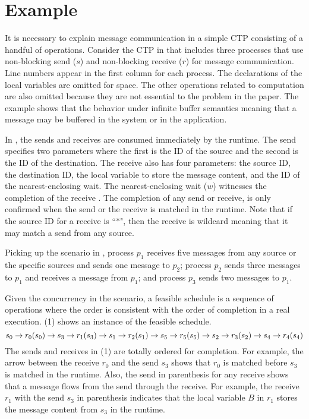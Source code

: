 \section{Example}

\examplefigone

It is necessary to explain message communication in a simple CTP consisting of a handful of operations. Consider the CTP in  that includes three processes that use non-blocking send ($s$) and non-blocking receive ($r$) for message communication. Line numbers appear in the first column for each process. The declarations of the local variables are omitted for space. The other operations related to computation are also omitted because they are not essential to the problem in the paper.
The example shows that the behavior under infinite buffer semantics meaning that a message may be buffered in the system or in the application.

In , the sends and receives are consumed immediately by the runtime. The send specifies two parameters where the first is the ID of the source and the second is the ID of the destination. The receive also has four parameters: the source ID, the destination ID, the local variable to store the message content, and the ID of the nearest-enclosing wait. The nearest-enclosing wait ($w$) witnesses the completion of the receive \cite{}. The completion of any send or receive, is only confirmed when the send or the receive is matched in the runtime. Note that if the source ID for a receive is ``$\ast$", then the receive is wildcard meaning that it may match a send from any source. 

Picking up the scenario in , process $p_1$ receives five messages from any source or the specific sources and sends one message to $p_2$; process $p_2$ sends three messages to $p_1$ and receives a message from $p_1$; and process $p_3$ sends two messages to $p_1$. 

Given the concurrency in the scenario, a feasible schedule is a sequence of operations where the order is consistent with the order of completion in a real execution. (1) shows an instance of the feasible schedule. 
\begin{equation}
\scriptsize
s_0\rightarrow r_0 (s_0)\rightarrow s_3\rightarrow r_1 (s_3)\rightarrow s_1\rightarrow r_2 (s_1)\rightarrow 
s_5\rightarrow r_5 (s_5)\rightarrow s_2\rightarrow r_3 (s_2)\rightarrow s_4\rightarrow r_4 (s_4)
\end{equation} 
The sends and receives in (1) are totally ordered for completion. For example, the arrow between the receive $r_0$ and the send $s_3$ shows that $r_0$ is matched before $s_3$ is matched in the runtime. 
Also, the send in parenthesis for any receive shows that a message flows from the send through the receive. 
For example, the receive $r_1$ with the send $s_3$ in parenthesis indicates that the local variable $B$ in $r_1$ stores the message content from $s_3$ in the runtime. 

